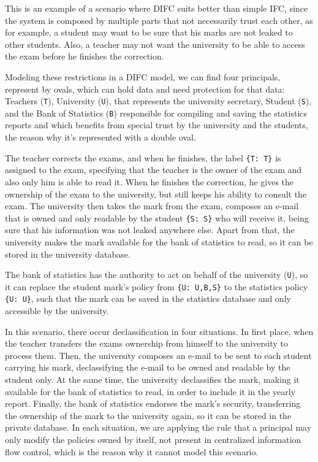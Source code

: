 This is an example of a scenario where DIFC suits better than simple IFC, since the system is composed by multiple parts that not necessarily trust each other, as for example, a student may want to be sure that his marks are not leaked to other students. Also, a teacher may not want the university to be able to access the exam before he finishes the correction.

Modeling these restrictions in a DIFC model, we can find four principals, represent by ovals, which can hold data and need protection for that data: Teachers (\texttt{T}), University (\texttt{U}), that represents the university secretary, Student (\texttt{S}), and the Bank of Statistics (\texttt{B}) responsible for compiling and saving the statistics reports and which benefits from special trust by the university and the students, the reason why it's represented with a double oval.

The teacher corrects the exams, and when he finishes, the label \texttt{\{T: T\}} is assigned to the exam, specifying that the teacher is the owner of the exam and also only him is able to read it. When he finishes the correction, he gives the ownership of the exam to the university, but still keeps his ability to consult the exam. The university then takes the mark from the exam, composes an e-mail that is owned and only readable by the student \texttt{\{S: S\}} who will receive it, being sure that his information was not leaked anywhere else. Apart from that, the university makes the mark available for the bank of statistics to read, so it can be stored in the university database.

The bank of statistics has the authority to act on behalf of the university (\texttt{U}), so it can replace the student mark's policy from \texttt{\{U: U,B,S\}} to the statistics policy \texttt{\{U: U\}}, such that the mark can be saved in the statistics database and only accessible by the university.

In this scenario, there occur declassification in four situations. In first place, when the teacher transfers the exams ownership from himself to the university to process them. Then, the university composes an e-mail to be sent to each student carrying his mark, declassifying the e-mail to be owned and readable by the student only. At the same time, the university declassifies the mark, making it available for the bank of statistics to read, in order to include it in the yearly report. Finally, the bank of statistics endorses the mark's security, transferring the ownership of the mark to the university again, so it can be stored in the private database. In each situation, we are applying the rule that a principal may only modify the policies owned by itself, not present in centralized information flow control, which is the reason why it cannot model this scenario.

